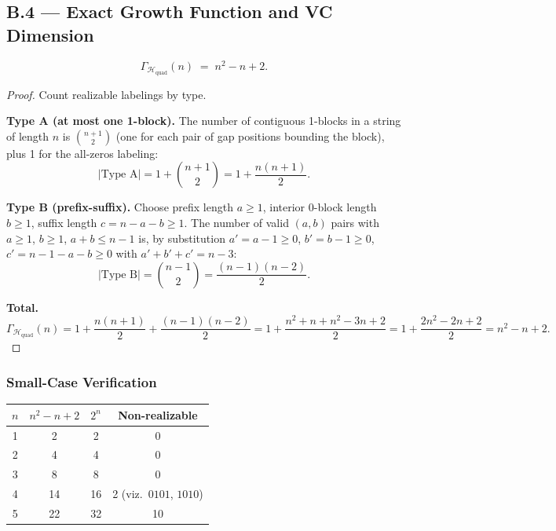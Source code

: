 \documentclass{article}
\begin{document}
\subsection{B.4 --- Exact Growth Function and VC Dimension}
 
\begin{theorem}
\[
  \Gamma_{\mathcal{H}_{\mathrm{quad}}}(n)
  \;=\;
  n^2-n+2.
\]
\end{theorem}
 
\begin{proof}
Count realizable labelings by type.
 
\textbf{Type A (at most one 1-block).}
The number of contiguous 1-blocks in a string of length $n$ is
$\binom{n+1}{2}$ (one for each pair of gap positions bounding the block),
plus 1 for the all-zeros labeling:
\[
  |\text{Type A}| = 1+\binom{n+1}{2} = 1+\frac{n(n+1)}{2}.
\]
 
\textbf{Type B (prefix-suffix).}
Choose prefix length $a\ge1$, interior 0-block length $b\ge1$, suffix length
$c=n-a-b\ge1$.  The number of valid $(a,b)$ pairs with $a\ge1$, $b\ge1$,
$a+b\le n-1$ is, by substitution $a'=a-1\ge0$, $b'=b-1\ge0$,
$c'=n-1-a-b\ge0$ with $a'+b'+c'=n-3$:
\[
  |\text{Type B}| = \binom{n-1}{2} = \frac{(n-1)(n-2)}{2}.
\]
 
\textbf{Total.}
\[
  \Gamma_{\mathcal{H}_{\mathrm{quad}}}(n)
  = 1+\frac{n(n+1)}{2}+\frac{(n-1)(n-2)}{2}
  = 1+\frac{n^2+n+n^2-3n+2}{2}
  = 1+\frac{2n^2-2n+2}{2}
  = n^2-n+2.
\]
\end{proof}
 
\subsubsection{Small-Case Verification}
 
\begin{center}
\begin{tabular}{cccc}
\toprule
$n$ & $n^2-n+2$ & $2^n$ & Non-realizable \\
\midrule
1 & 2 & 2 & 0 \\
2 & 4 & 4 & 0 \\
3 & 8 & 8 & 0 \\
4 & 14 & 16 & 2 (viz.\ $0101$, $1010$) \\
5 & 22 & 32 & 10 \\
\bottomrule
\end{tabular}
\end{center}
 
\end{document}
